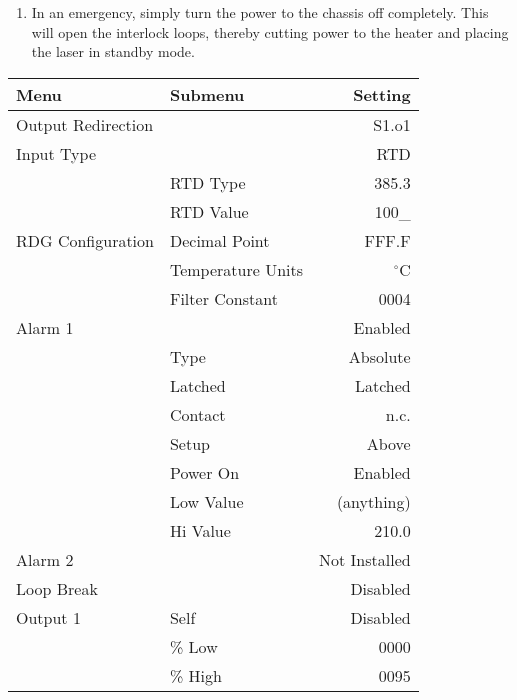 {\begin{enumerate}
\item In an emergency, simply turn the power to the chassis off completely.
  This will open the interlock loops, thereby cutting power to the heater
  and placing the laser in standby mode.

\end{enumerate}

\begin{table}
\begin{center}
\begin{tabular}{|l|l|r|}
\hline\hline
Menu & Submenu & Setting \\
\hline
Output Redirection  &                        & S1.o1 \\
\hline
Input Type          &                        & RTD   \\
                    & RTD Type               & 385.3 \\
                    & RTD Value              & 100\_  \\
\hline
RDG Configuration   & Decimal Point          & FFF.F \\
                    & Temperature Units      & $^\circ$C \\
                    & Filter Constant        & 0004 \\
\hline
Alarm 1             &                        & Enabled \\
                    & Type                   & Absolute \\
                    & Latched                & Latched \\
                    & Contact                & n.c. \\
                    & Setup                  & Above \\
                    & Power On               & Enabled \\
                    & Low Value              & (anything) \\
                    & Hi Value               & 210.0 \\
\hline
Alarm 2             &                        & Not Installed \\
\hline
Loop Break          &                        & Disabled \\  
\hline
Output 1            & Self                   & Disabled \\
                    & \% Low                 & 0000 \\
                    & \% High                & 0095 \\

\end{tabular}
\end{center}
\end{table}}
